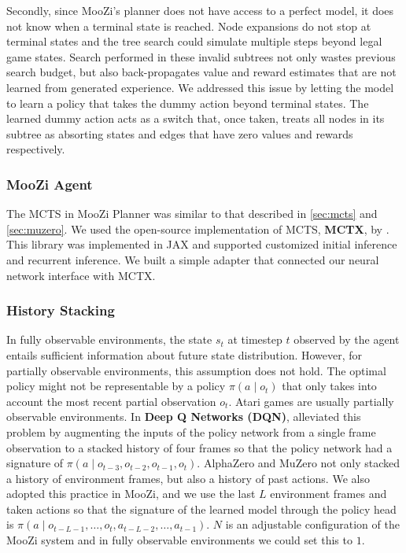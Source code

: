 \documentclass[12pt]{article}
\newcommand{\note}[1]{\todo[color=yellow!40,bordercolor=none,linecolor=black]{~~ #1}}
\begin{document}
Secondly, since MooZi's planner does not have access to a perfect model, it does not know when a terminal state is reached.
Node expansions do not stop at terminal states and the tree search could simulate multiple steps beyond legal game states.
Search performed in these invalid subtrees not only wastes previous search budget, but also back-propagates value and reward estimates that are not learned from generated experience.
We addressed this issue by letting the model to learn a policy that takes the dummy action beyond terminal states.
The learned dummy action acts as a switch that, once taken, treats all nodes in its subtree as absorting states and edges that have zero values and rewards respectively.

\subsubsection{MooZi Agent}

The MCTS in MooZi Planner was similar to that described in \ref{sec:mcts} and \ref{sec:muzero}.
We used the open-source implementation of MCTS, \textbf{MCTX}, by \citeauthor{POLICYIMPROVEMENTPLANNING_Danihelka.Guez.ea_2022} \cite{POLICYIMPROVEMENTPLANNING_Danihelka.Guez.ea_2022}.
This library was implemented in JAX and supported \note{supports?} customized initial inference and recurrent inference.
We built a simple adapter that connected our neural network interface with MCTX.

\subsubsection{History Stacking} \label{sec:history_stacking}
In fully observable environments, the state $s_t$ at timestep $t$ observed by the agent entails sufficient information about future state distribution.
However, for partially observable environments, this assumption does not hold.
The optimal policy might not be representable by a policy $\pi(a \mid o_t)$ that only takes into account the most recent partial observation $o_t$.
Atari games are usually partially observable environments.
In \textbf{Deep Q Networks (DQN)}, \citeauthor{PlayingAtariDeep_Mnih.Kavukcuoglu.ea_2013} alleviated this problem by augmenting the inputs of the policy network from a single frame observation to a stacked history of four frames so that the policy network had a signature of $\pi(a \mid o_{t-3}, o_{t-2}, o_{t-1}, o_t)$.
AlphaZero and MuZero not only stacked a history of environment frames, but also a history of past actions.
We also adopted this practice in MooZi, and we use the last $L$ environment frames and taken actions so that the signature of the learned model through the policy head is $\pi(a \mid o_{t - L - 1}, \dots, o_t, a_{t - L - 2}, \dots, a_{t-1})$.
$N$ is an adjustable configuration of the MooZi system and in fully observable environments we could set this to $1$.
\end{document}
